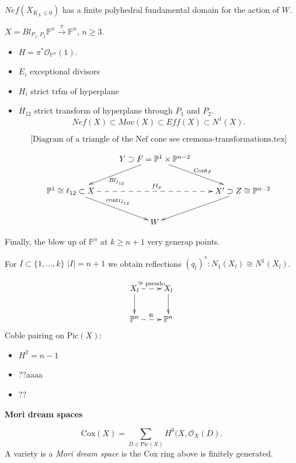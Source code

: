 \begin{theorem}
\label{theorem-durso}
$Nef(X_{K_X \leq 0})$ has a finite polyhedral
fundamental domain for the action of $W$.
\end{theorem}

\begin{example}
\label{example-blowup-moridream}
$X = Bl_{P_1,P_2}\mathbb{P}^n
\xrightarrow{\pi}\mathbb{P}^n$,
$n\geq  3$.

\begin{itemize}
\item $H = \pi^*\mathcal{O}_{\mathbb{P}^n}
(1)$.
\item $E_i$ exceptional divisors
\item $H_i$ strict trfm of hyperplane
\item $H_{12}$ strict transform
of hyperplane through $P_1$ and $P_2$.
$$
Nef(X) \subset Mov(X) \subset Ef f(X)
\subset N^1(X).
$$

$$
[\text{Diagram of a triangle of the
Nef cone
see cremona-transformations.tex]}
$$

$$
\xymatrix{
&Y \supset F=\mathbb{P}^1 \times
\mathbb{P}^{n-2}\ar[dl]
^{Bl_{\tilde{\ell}_{12}}}
\ar[dr]^{\text{Cont}_F}\\
\mathbb{P}^1 \cong \ell_{12}
\subset X \ar@{-->}[rr]^{f\ell_p}
\ar[dr]^{\text{contr}_{\tilde{\ell}_{12}}}&&
 X' \supset Z \cong \mathbb{P}^{n-2}
\ar[dl] \\
& W
}
$$
\end{itemize}
\end{example}

\noindent
Finally, the blow up of $\mathbb{P}^n$
at $k \geq  n+1$ very generap points.

For $I \subset \{ 1,…, k \}$
$|I|=n+1$ we obtain reflections
$(q_l)^*:N_1(X_l) \cong N^1(X_l)$.

$$
  \xymatrix{
  X_l \ar@{-->}[r]^{\cong \text{ pseudo}}
  \ar[d] & X_l \ar[d]\\
  \mathbb{P}^n \ar@{-->}[r]^{q_l} &
  \mathbb{P}^n
  }
  $$
Coble pairing on $\text{Pic}(X)$:
\begin{itemize}
\item $H^2=n-1$
\item ??aaaa
\item ??
\end{itemize}

\medskip\noindent
{\bf Mori dream spaces} 

\begin{definition}
\label{definition-cox-ring}
$$
\text{Cox}(X) = \sum_{D \in \text{Pic}(X)}
H^0(X,\mathcal{O}_X(D).
$$
A variety is a {\it Mori dream space} 
is the Cox ring above is finitely generated.
\end{definition}

